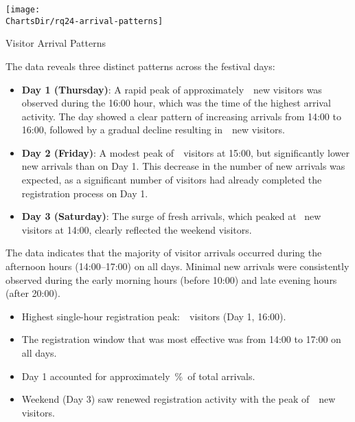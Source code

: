 \begin{chart}[h]
	\centering
	\texttt{[image: \\ChartsDir/rq24-arrival-patterns]}
	\caption{ Visitor Arrival Patterns}
	\label{chart:visitor-arrival-patterns}
	\source
\end{chart}

The data reveals three distinct patterns across the festival days:

\begin{itemize}
	\item \textbf{Day 1 (Thursday)}: A rapid peak of approximately~~new visitors was observed during the 16:00 hour, which was the time of the highest arrival activity.
	The day showed a clear pattern of increasing arrivals from 14:00 to 16:00, followed by a gradual decline resulting in~~new visitors.
	\item \textbf{Day 2 (Friday)}: A modest peak of~~visitors at 15:00, but significantly lower new arrivals than on Day 1.
	This decrease in the number of new arrivals was expected, as a significant number of visitors had already completed the registration process on Day 1.
	\item \textbf{Day 3 (Saturday)}: The surge of fresh arrivals, which peaked at~ new visitors at 14:00, clearly reflected the weekend visitors.
\end{itemize}

The data indicates that the majority of visitor arrivals occurred during the afternoon hours (14:00–17:00) on all days.
Minimal new arrivals were consistently observed during the early morning hours (before 10:00) and late evening hours (after 20:00).

\begin{keytakeaways}
	\begin{itemize}
		\item Highest single-hour registration peak:~~visitors (Day 1, 16:00).
		\item The registration window that was most effective was from 14:00 to 17:00 on all days.
		\item Day 1 accounted for approximately~\%~of total arrivals.
		\item Weekend (Day 3) saw renewed registration activity with the peak of~~new visitors.
	\end{itemize}
\end{keytakeaways}



